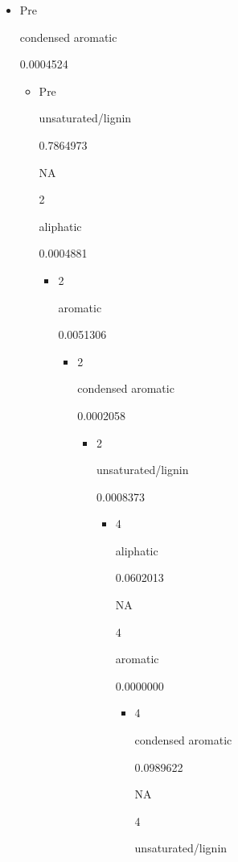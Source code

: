 \documentclass[
]{article}
\begin{document}
\begin{itemize}
\item
  Pre

  condensed aromatic

  0.0004524

  \begin{itemize}
  \item
    Pre

    unsaturated/lignin

    0.7864973

    NA

    2

    aliphatic

    0.0004881

    \begin{itemize}
    \item
      2

      aromatic

      0.0051306

      \begin{itemize}
      \item
        2

        condensed aromatic

        0.0002058

        \begin{itemize}
        \item
          2

          unsaturated/lignin

          0.0008373

          \begin{itemize}
          \item
            4

            aliphatic

            0.0602013

            NA

            4

            aromatic

            0.0000000

            \begin{itemize}
            \item
              4

              condensed aromatic

              0.0989622

              NA

              4

              unsaturated/lignin


\end{itemize}
\end{itemize}
\end{itemize}
\end{itemize}
\end{itemize}
\end{itemize}
\end{itemize}
\end{document}
